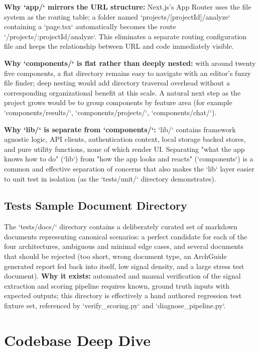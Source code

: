 \documentclass[11pt,a4paper]{report}
\begin{document}
\textbf{Why `app/` mirrors the URL structure:} Next.js's App Router uses the file system as the routing table; a folder named `projects/[projectId]/analyze` containing a `page.tsx` automatically becomes the route `/projects/:projectId/analyze`. This eliminates a separate routing configuration file and keeps the relationship between URL and code immediately visible.

\textbf{Why `components/` is flat rather than deeply nested:} with around twenty five components, a flat directory remains easy to navigate with an editor's fuzzy file finder; deep nesting would add directory traversal overhead without a corresponding organizational benefit at this scale. A natural next step as the project grows would be to group components by feature area (for example `components/results/`, `components/projects/`, `components/chat/`).

\textbf{Why `lib/` is separate from `components/`:} `lib/` contains framework agnostic logic, API clients, authentication context, local storage backed stores, and pure utility functions, none of which render UI. Separating "what the app knows how to do" (`lib`) from "how the app looks and reacts" (`components`) is a common and effective separation of concerns that also makes the `lib` layer easier to unit test in isolation (as the `tests/unit/` directory demonstrates).

\section{Tests Sample Document Directory}

The `tests/docs/` directory contains a deliberately curated set of markdown documents representing canonical scenarios: a perfect candidate for each of the four architectures, ambiguous and minimal edge cases, and several documents that should be rejected (too short, wrong document type, an ArchGuide generated report fed back into itself, low signal density, and a large stress test document). \textbf{Why it exists:} automated and manual verification of the signal extraction and scoring pipeline requires known, ground truth inputs with expected outputs; this directory is effectively a hand authored regression test fixture set, referenced by `verify_scoring.py` and `diagnose_pipeline.py`.

\chapter{Codebase Deep Dive}
\end{document}
